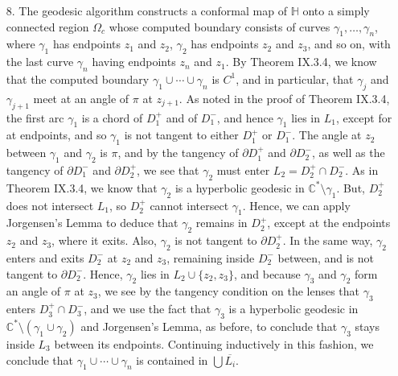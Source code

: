 \documentclass[11pt]{book}
\theoremstyle{definition}
\begin{document}
\begin{enumerate}
  \item[8.] %
    The geodesic algorithm constructs a conformal map of $\mathbb H$ onto a simply connected region $\Omega_c$ whose computed boundary consists of curves $\gamma_1,\ldots, \gamma_n$, where $\gamma_1$ has endpoints $z_1$ and $z_2$, $\gamma_2$ has endpoints $z_2$ and $z_3$, and so on, with the last curve $\gamma_n$ having endpoints $z_n$ and $z_1$.  By Theorem IX.3.4, we know that the computed boundary $\gamma_1 \cup \cdots \cup \gamma_n$ is $C^1$, and in particular, that $\gamma_j$ and $\gamma_{j+1}$ meet at an angle of $\pi$ at $z_{j+1}$.  As noted in the proof of Theorem IX.3.4, the first arc $\gamma_1$ is a chord of $D_1^+$ and of $D_1^-$, and hence $\gamma_1$ lies in $L_1$, except for at endpoints, and so $\gamma_1$ is not tangent to either $D_1^+$ or $D_1^-$.  
    The angle at $z_2$ between $\gamma_1$ and $\gamma_2$ is $\pi$, and by the tangency of $\partial D_1^+$ and $\partial D_2^-$, as well as the tangency of $\partial D_1^-$ and $\partial D_2^+$, we see that $\gamma_2$ must enter $L_2 = D_2^+ \cap D_2^-$. As in Theorem IX.3.4, we know that $\gamma_2$ is a hyperbolic geodesic in $\mathbb C^* \setminus \gamma_1$.  But, $D_2^+$ does not intersect $L_1$, so $D_2^+$ cannot intersect $\gamma_1$.  Hence, we can apply Jorgensen's Lemma to deduce that $\gamma_2$ remains in $D_2^+$, except at the endpoints $z_2$ and $z_3$, where it exits. Also, $\gamma_2$ is not tangent to $\partial D_2^+$.  In the same way, $\gamma_2$ enters and exits $D_2^-$ at $z_2$ and $z_3$, remaining inside $D_2^-$ between, and is not tangent to $\partial D_2^-$.  Hence, $\gamma_2$ lies in $L_2 \cup \{ z_2, z_3 \}$, and because $\gamma_3$ and $\gamma_2$ form an angle of $\pi$ at $z_3$, we see by the tangency condition on the lenses that $\gamma_3$ enters $D_3^+ \cap D_3^-$, and we use the fact that $\gamma_3$ is a hyperbolic geodesic in $\mathbb C^* \setminus (\gamma_1 \cup \gamma_2)$ and Jorgensen's Lemma, as before, to conclude that $\gamma_3$ stays inside $L_3$ between its endpoints.   Continuing inductively in this fashion, we conclude that $\gamma_1 \cup \cdots \cup \gamma_n$ is contained in $\bigcup \overline{L_i}$.
\end{enumerate}
\end{document}
